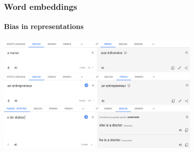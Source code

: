 \documentclass[9pt]{beamer}
\begin{document}
\begin{frame}
  \frametitle{Word embeddings}

  \framesubtitle{Bias in representations}

  \begin{center}
    \includegraphics[width = 10cm]{images/nurse.png} \\[.5cm]
    \includegraphics[width = 10cm]{images/entrepreneur.png} \\[.5cm]
    \includegraphics[width = 10cm]{images/doctor.png}
  \end{center}
\end{frame}
\end{document}
